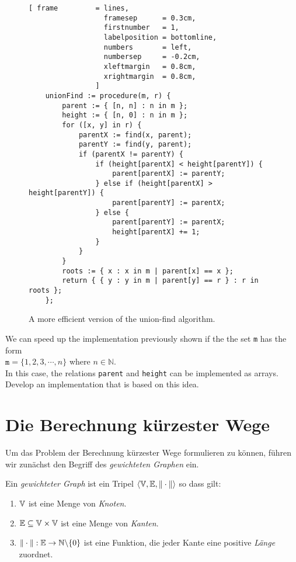 \begin{figure}[!ht]
\centering
\begin{Verbatim}[ frame         = lines, 
                  framesep      = 0.3cm, 
                  firstnumber   = 1,
                  labelposition = bottomline,
                  numbers       = left,
                  numbersep     = -0.2cm,
                  xleftmargin   = 0.8cm,
                  xrightmargin  = 0.8cm,
                ]
    unionFind := procedure(m, r) {
        parent := { [n, n] : n in m };
        height := { [n, 0] : n in m };
        for ([x, y] in r) {
            parentX := find(x, parent);
            parentY := find(y, parent);
            if (parentX != parentY) {
                if (height[parentX] < height[parentY]) {
                    parent[parentX] := parentY;  
                } else if (height[parentX] > height[parentY]) {
                    parent[parentY] := parentX;  
                } else {
                    parent[parentY] := parentX;  
                    height[parentX] += 1;
                }
            }
        }
        roots := { x : x in m | parent[x] == x };
        return { { y : y in m | parent[y] == r } : r in roots };
    };
\end{Verbatim}
\vspace*{-0.3cm}
\caption{A more efficient version of the union-find algorithm.}
\label{fig:union-find.stlx}
\end{figure}

\exercise
We can speed up the implementation previously shown if the the set \texttt{m} has the form
\\[0.2cm]
\hspace*{1.3cm}
$\mathtt{m} = \{ 1, 2, 3, \cdots, n \}$ \quad where $n \in \mathbb{N}$.
\\[0.2cm]
In this case, the relations \texttt{parent} and \texttt{height} can be implemented as arrays.
Develop an implementation that is based on this idea.
\eox

\section[Shortest Paths]{Die Berechnung k\"urzester Wege}
Um das Problem der Berechnung k\"urzester Wege formulieren zu k\"onnen, f\"uhren wir zun\"achst 
den Begriff des \emph{gewichteten Graphen} ein.  

\begin{Definition} \lb
  Ein  {\em gewichteter Graph} ist ein Tripel 
   $\langle {\mathbb V}, {\mathbb E}, \|\cdot\| \rangle$ so dass gilt:
  \begin{enumerate}
  \item ${\mathbb V}$ ist eine Menge von \emph{Knoten}.
  \item ${\mathbb E} \subseteq {\mathbb V} \times {\mathbb V}$ ist eine Menge von \emph{Kanten}.
  \item $\|\cdot\|: {\mathbb E} \rightarrow {\mathbb N} \backslash\{0\}$ ist eine Funktion,
        die jeder Kante eine positive \emph{L\"ange} zuordnet.
        \conclude
  \end{enumerate}
\end{Definition}

